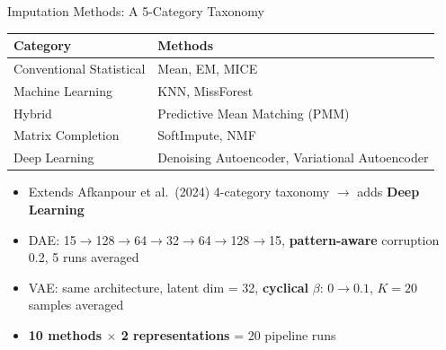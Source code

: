 \documentclass[aspectratio=169, 11pt]{beamer}
\begin{document}
\begin{frame}{Imputation Methods: A 5-Category Taxonomy}

  \small
  \begin{table}
    \centering
    \begin{tabular}{l l}
      \toprule
      \textbf{Category} & \textbf{Methods} \\
      \midrule
      Conventional Statistical & Mean, EM, MICE \\
      Machine Learning         & KNN, MissForest \\
      Hybrid                   & Predictive Mean Matching (PMM) \\
      Matrix Completion        & SoftImpute, NMF \\
      Deep Learning            & Denoising Autoencoder, Variational Autoencoder \\
      \bottomrule
    \end{tabular}
  \end{table}

  \vspace{0.5em}
  \begin{itemize}
    \item Extends Afkanpour et al.\ (2024) 4-category taxonomy $\to$ adds \textbf{Deep Learning}
    \item DAE: 15$\to$128$\to$64$\to$32$\to$64$\to$128$\to$15, \textbf{pattern-aware} corruption 0.2, 5 runs averaged
    \item VAE: same architecture, latent dim = 32, \textbf{cyclical} $\beta$: $0 \to 0.1$, $K = 20$ samples averaged
    \item \textbf{10 methods $\times$ 2 representations} = 20 pipeline runs
  \end{itemize}
\end{frame}
\end{document}
